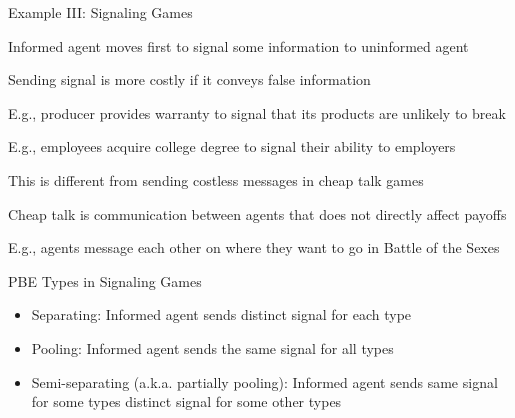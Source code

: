 \documentclass[11pt,aspectratio=169]{beamer}
\begin{document}
  
  \begin{frame}{Example III: Signaling Games}
     \begin{itemizes}
      \item \alert{Informed} agent moves first to \alert{signal} some information to uninformed agent
      \item Sending signal is more costly if it conveys false information
      \item E.g., producer provides warranty to signal that its products are unlikely to break
      \item E.g., employees acquire college degree to signal their ability to employers
      \item This is different from sending costless \alert{messages} in \alert{cheap talk} games
      \item Cheap talk is communication between agents that does not directly affect payoffs
      \item E.g., agents message each other on where they want to go in  Battle of the Sexes
     \end{itemizes}
  \end{frame}
  
  
  \begin{frame}{PBE Types in Signaling Games}
   \begin{itemize}[<+->]
   \setlength{\itemsep}{1em}
    \item \alert{Separating}: Informed agent sends distinct signal for each type
    \item \alert{Pooling}: Informed agent sends the same signal for all types
    \item \alert{Semi-separating} (a.k.a. partially pooling): Informed agent sends same signal for some types distinct signal for some other types
   \end{itemize}
  \end{frame}
  
\end{document}
